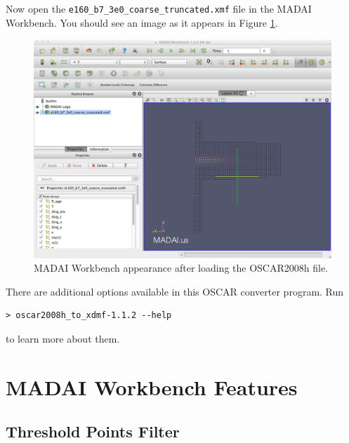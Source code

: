 \documentclass[12pt]{article}
\begin{document}
Now open the \texttt{e160\_b7\_3e0\_coarse\_truncated.xmf} file in the MADAI Workbench. You should see an image as it appears in Figure \ref{fig:OSCAR2008H_ScreenShot}.


\begin{figure}[htbp]
   \centering
   \includegraphics[scale=.35]{images/OSCAR2008H_ScreenShot.png} %
   \caption{MADAI Workbench appearance after loading the OSCAR2008h file.}
   \label{fig:OSCAR2008H_ScreenShot}
\end{figure}

There are additional options available in this OSCAR converter program. Run

\begin{verbatim}
> oscar2008h_to_xdmf-1.1.2 --help
\end{verbatim}
to learn more about them.

\section{MADAI Workbench Features}

\subsection{Threshold Points Filter}
\end{document}
